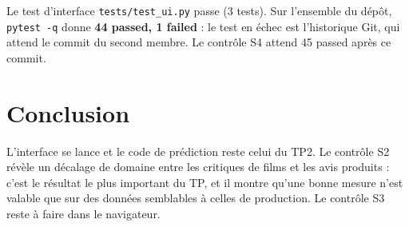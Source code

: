 \documentclass[11pt,a4paper]{article}
\begin{document}
Le test d'interface \texttt{tests/test\_ui.py} passe (3 tests). Sur l'ensemble du dépôt, \texttt{pytest -q} donne \textbf{44 passed, 1 failed} : le test en échec est l'historique Git, qui attend le commit du second membre. Le contrôle S4 attend 45 passed après ce commit.

\section*{Conclusion}

L'interface se lance et le code de prédiction reste celui du TP2. Le contrôle S2 révèle un décalage de domaine entre les critiques de films et les avis produits : c'est le résultat le plus important du TP, et il montre qu'une bonne mesure n'est valable que sur des données semblables à celles de production. Le contrôle S3 reste à faire dans le navigateur.
\end{document}

